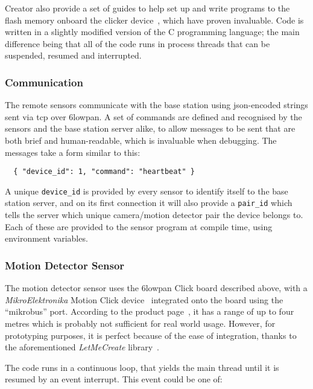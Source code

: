 Creator also provide a set of guides to help set up and write programs to the
flash memory onboard the clicker device~\cite{clickersetupguide}, which have
proven invaluable. Code is written in a slightly modified version of the C
programming language; the main difference being that all of the code runs in
process threads that can be suspended, resumed and interrupted.

\subsubsection{Communication}
The remote sensors communicate with the base station using
\acrshort{json}-encoded strings sent via \acrshort{tcp} over \gls{6lowpan}. A
set of commands are defined and recognised by the sensors and the base
station server alike, to allow messages to be sent that are both brief and
human-readable, which is invaluable when debugging. The messages take a form similar to this:

\begin{verbatim}
  { "device_id": 1, "command": "heartbeat" }
\end{verbatim}

A unique \texttt{device\_id} is provided by every sensor to identify itself
to the base station server, and on its first connection it will also provide
a \texttt{pair\_id} which tells the server which unique camera/motion
detector pair the device belongs to. Each of these are provided to the sensor
program at compile time, using environment variables.~

\subsubsection{Motion Detector Sensor}
The motion detector sensor uses the \gls{6lowpan} Click board described
above, with a \textit{MikroElektronika} Motion Click
device~\cite{motionclick} integrated onto the board using the
``\gls{mikrobus}'' port. According to the product page~\cite{motionclick}, it
has a range of up to four metres which is probably not sufficient for real
world usage. However, for prototyping purposes, it is perfect because of the
ease of integration, thanks to the aforementioned \textit{LetMeCreate}
library~\cite{letmecreate}.

The code runs in a continuous loop, that yields the main thread until it is
resumed by an event interrupt. This event could be one of:

